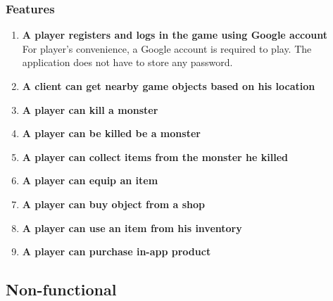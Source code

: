 		\subsubsection{Features}
		\begin{enumerate}
			\item \textbf{A player registers and logs in the game using Google account} \\
			For player's convenience, a Google account is required to play. The application does not have to store any password. 
			\item \textbf{A client can get nearby game objects based on his location} \\
			
			\item \textbf{A player can kill a monster} \\
			\item \textbf{A player can be killed be a monster} \\
			\item \textbf{A player can collect items from the monster he killed} \\
			\item \textbf{A player can equip an item} \\				
			\item \textbf{A player can buy object from a shop} \\
			\item \textbf{A player can use an item from his inventory} \\
			\item \textbf{A player can purchase in-app product} \\
		\end{enumerate}
		
		
	\subsection{Non-functional}
	
